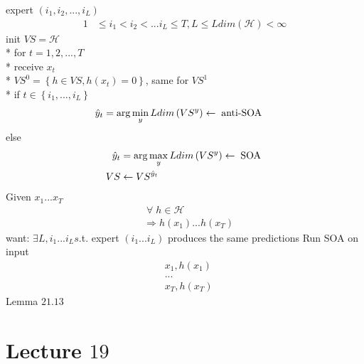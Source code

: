 \documentclass{article}
\begin{document}
expert $\left(i_{1}, i_{2}, ..., i_{L}\right)$
\begin{align*}
1 &\leq  i_{1} < i_{2} < ... i_{L} \leq  T , L \leq  Ldim\left(\mathcal{H}\right)  < \infty
\end{align*}
init $VS  = \mathcal{H}$
\\* for $t  = 1, 2, ..., T $
\\* receive $x_{t}$
\\* $VS^{0}  = \left\{h \in VS , h\left(x_{t}\right) = 0\right\}$, same for $VS^{1} $
\\* if $t  \in \left\{i_{1}, ..., i_{L}\right\}$
\begin{align*}
\hat{y}_{t} &= \arg\displaystyle\min_{y} Ldim\left(VS^{y} \right)  \leftarrow \text{\;anti-SOA\;}
\end{align*}
else
\begin{align*}
\hat{y}_{t} &= \arg\displaystyle\max_{y} Ldim\left(VS^{y} \right)  \leftarrow \text{\;SOA\;}
\\ VS  &\leftarrow VS^{\hat{y}_{t}} 
\end{align*}
Given $x_{1} ... x_{T}$
\begin{align*}
&\;\forall\; h \in \mathcal{H}
\\ &\Rightarrow  h\left(x_{1}\right) ... h\left(x_{T}\right)
\end{align*}
want: $\exists L, i_{1} ... i_{L} s$.t. expert $\left(i_{1} ... i_{L}\right)$ produces the same predictions
\newline \newline
Run SOA on input
\begin{align*}
&x_{1}, h\left(x_{1}\right)
\\ &...
\\ &x_{T}, h\left(x_{T}\right)
\end{align*}
Lemma $21.13$
\newline \newline




\section{Lecture $19$} 
\end{document}
